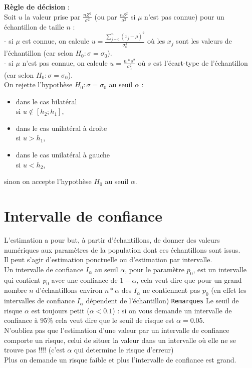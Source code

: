 \documentclass[a4paper,11pt]{book}
\begin{document}
{\bf R\`egle de d\'ecision} :\\
Soit  $u$  la valeur prise par $\displaystyle \frac{nZ^2}{\sigma^2}$ (ou par 
$\displaystyle \frac{nS^2}{\sigma^2}$ si $\mu$ n'est pas connue) pour un 
\'echantillon de taille $n$ :\\
- si $\mu$ est connue, on calcule $\displaystyle u=\frac{\sum_{j=0}^n(x_j-\mu)^2}{\sigma_0^2}$ o\`u les $x_j$ sont les valeurs de l'\'echantillon 
(car selon $H_0 :\sigma =\sigma_0$).\\
- si $\mu$ n'est pas connue, on calcule 
$\displaystyle u=\frac{n*s^2}{\sigma_0^2}$ o\`u  $s$ est l'\'ecart-type de 
l'\'echantillon (car selon $H_0 :\sigma =\sigma_0$).\\
On rejette l'hypoth\`ese $H_0 :\sigma =\sigma_0$ au seuil $\alpha$ :
\begin{itemize}
\item dans le cas bilat\'eral\\ 
si $u\not\in [h_2;h_1]$, 
\item dans le cas unilat\'eral \`a droite\\
si $u>h_1$,
\item dans le cas unilat\'eral \`a gauche\\
si $u<h_2$, 
\end{itemize}
sinon on accepte l'hypoth\`ese $H_0$ au seuil $\alpha$.
\section{Intervalle de confiance}
L'estimation a pour but, \`a partir d'\'echantillons, de donner des valeurs 
num\'eriques aux param\`etres de la population dont ces \'echantillons sont 
issus.\\ 
Il peut s'agir d'estimation ponctuelle ou d'estimation par intervalle.\\
Un intervalle de confiance $I_\alpha$ au seuil $\alpha$, pour le param\`etre 
$p_0$, est un intervalle qui contient $p_0$ avec une confiance  
de $1-\alpha$,  cela veut dire que pour un grand nombre $n$ d'\'echantillons 
environ $n*\alpha$ des $I_\alpha$ ne contiennent pas $p_0$ (en effet les 
intervalles de confiance $I_\alpha$ d\'ependent de l'\'echantillon)
{\tt Remarques}
Le seuil de risque  $\alpha$ est toujours petit ($\alpha<0.1$) : si on vous 
demande un  intervalle de confiance \`a 95\% cela veut dire 
que le seuil de risque est $\alpha=0.05$.\\
N'oubliez pas que l'estimation d'une valeur par un intervalle de confiance
 comporte un risque, celui de situer la valeur dans un intervalle o\`u elle ne 
se trouve pas !!!! (c'est $\alpha$ qui determine le risque d'erreur)\\
Plus on demande un risque faible et plus l'intervalle de confiance est grand.
\end{document}
